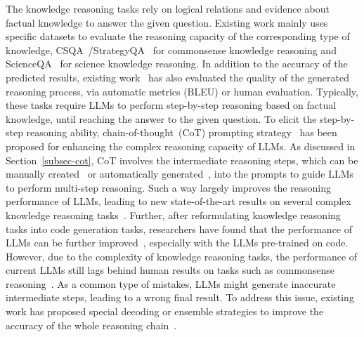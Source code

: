 The knowledge reasoning tasks rely on logical relations and evidence about factual knowledge to answer the given question.
Existing work mainly uses specific datasets to evaluate the reasoning capacity of the corresponding type of knowledge, \eg CSQA~\cite{Talmor-naacl-2019-CommonsenseQA}/StrategyQA~\cite{Geva-tacl-2021-Did} for commonsense knowledge reasoning and ScienceQA~\cite{Saikh-IJDL-2022-ScienceQA} for science knowledge reasoning. 
{In addition to the accuracy of the predicted results, existing work~\cite{Saikh-IJDL-2022-ScienceQA} has  also evaluated the quality of the generated reasoning process, via automatic metrics (\eg BLEU) or human evaluation.}
Typically, these tasks require LLMs to perform step-by-step reasoning based on factual knowledge, until reaching the answer to the given question. 
To elicit the  %
{step-by-step reasoning} ability, chain-of-thought~(CoT) prompting strategy~\cite{Wei-arxiv-2022-chain} has been proposed for enhancing the complex reasoning capacity of LLMs. 
As discussed in Section~\ref{subsec-cot}, CoT involves the intermediate reasoning steps, which can be manually created~\cite{Wei-arxiv-2022-chain} or automatically generated~\cite{Shao-arxiv-2023-Synthetic}, into the prompts to guide LLMs to perform multi-step reasoning.
Such a way largely improves the reasoning performance of LLMs, leading to new state-of-the-art results on several complex knowledge reasoning tasks~\cite{Wei-arxiv-2022-chain,Chowdhery-arxiv-2022-PaLM,Ning-arxiv-2023-ChatGPT}. 
Further, after reformulating knowledge reasoning tasks into code generation tasks, researchers have found that the performance of LLMs can be further improved~\cite{Madaan-emnlp-2022-Language}, especially with the LLMs pre-trained on code. 
{However, due to the complexity of knowledge reasoning tasks, the  performance  of current LLMs still lags behind human results on tasks such as commonsense reasoning~\cite{Wei-arxiv-2022-chain,Chowdhery-arxiv-2022-PaLM,Sifatkaur-arxiv-2023-Mind}.}
As a common type of   mistakes, LLMs might generate inaccurate  {intermediate steps},  leading to a wrong final result.
To address this issue, existing work has proposed special decoding or ensemble strategies to improve the accuracy of the whole reasoning chain~\cite{Wang-arxiv-2022-Self-Consistency,Li-arxiv-2022-On}. 
%

